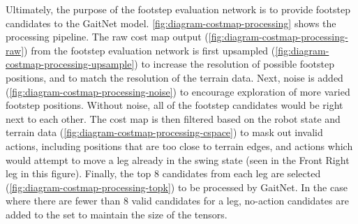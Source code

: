Ultimately, the purpose of the footstep evaluation network is to
provide footstep candidates to the GaitNet model.
\autoref{fig:diagram-costmap-processing} shows the processing pipeline.
The raw cost map output (\autoref{fig:diagram-costmap-processing-raw})
from the footstep evaluation network is first upsampled
(\autoref{fig:diagram-costmap-processing-upsample}) to increase the
resolution of possible footstep positions, and to match the resolution of
the terrain data. Next, noise is added
(\autoref{fig:diagram-costmap-processing-noise}) to
encourage exploration of more varied footstep positions. Without noise,
all of the footstep candidates would be right next to each other.
The cost map is then filtered based on the robot state and terrain data
(\autoref{fig:diagram-costmap-processing-cspace}) to mask out
invalid actions, including positions that are too close to terrain edges,
and actions which would attempt to move a leg already in the swing state
(seen in the Front Right leg in this figure). Finally, the top 8
candidates from each leg are selected
(\autoref{fig:diagram-costmap-processing-topk})
to be processed by GaitNet. In the case where there are fewer than 8 valid
candidates for a leg, no-action candidates are added to the set to maintain
the size of the tensors.

\def\imgwidth{0.16\textwidth}
\def\xgap{2em}          %
\def\arrowwidth{1.2em}  %
\def\arrowshift{0.5em} %

